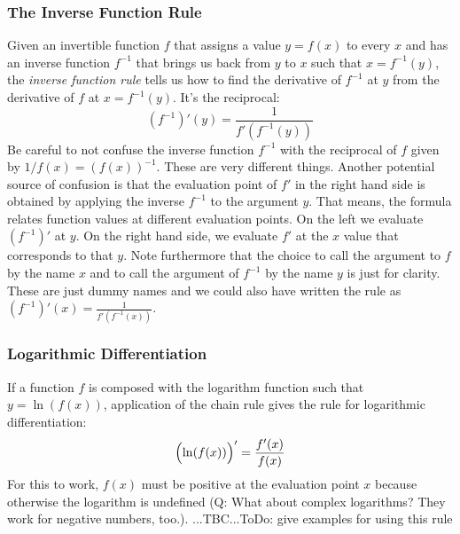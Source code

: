 \subsubsection{The Inverse Function Rule}
Given an invertible function $f$ that assigns a value $y = f(x)$ to every $x$ and has an inverse function  $f^{-1}$ that brings us back from $y$ to $x$ such that $x = f^{-1}(y)$, the \emph{inverse function rule} tells us how to find the derivative of  $f^{-1}$ at $y$ from the derivative of $f$ at $x = f^{-1}(y)$. It's the reciprocal:
\begin{equation}
 (f^{-1})'(y) = \frac{1}{f'(f^{-1}(y))}
\end{equation}
Be careful to not confuse the inverse function $f^{-1}$ with the reciprocal of $f$ given by $1/f(x) = (f(x))^{-1}$. These are very different things. Another potential source of confusion is that the evaluation point of $f'$ in the right hand side is obtained by applying the inverse $f^{-1}$ to the argument $y$. That means, the formula relates function values at different evaluation points. On the left we evaluate $(f^{-1})'$ at $y$. On the right hand side, we evaluate $f'$ at the $x$ value that corresponds to that $y$. Note furthermore that the choice to call the argument to $f$ by the name $x$ and to call the argument of $f^{-1}$ by the name $y$ is just for clarity. These are just dummy names and we could also have written the rule as $(f^{-1})'(x) = \frac{1}{f'(f^{-1}(x))}$. 









\subsubsection{Logarithmic Differentiation} 
If a function $f$ is composed with the logarithm function such that $y = \ln(f(x))$, application of the chain rule gives the rule for logarithmic differentiation:
\begin{equation}
 \Bigl( \ln(f(x)) \Bigr)' = \frac{f'(x)}{f(x)}
\end{equation}
For this to work, $f(x)$ must be positive at the evaluation point $x$ because otherwise the logarithm is undefined (Q: What about complex logarithms? They work for negative numbers, too.). ...TBC...ToDo: give examples for using this rule

